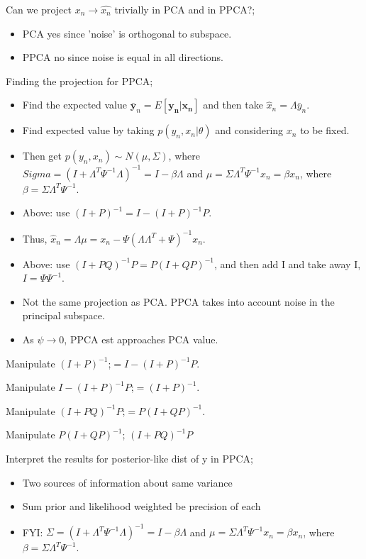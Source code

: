\documentclass{article}
\begin{document}
Can we project $x_n \rightarrow \hat{x_n}$ trivially in PCA and in PPCA?; \begin{itemize} \item PCA yes since 'noise' is orthogonal to subspace.  \item PPCA no since noise is equal in all directions.  \end{itemize} 

Finding the projection for PPCA; \begin{itemize} \item Find the expected value $\mathbf{\bar{y}}_n=E[\mathbf{y_n|x_n}]$ and then take $\hat{x}_n=\Lambda\bar{y}_n$.  \item Find expected value by taking $p(y_n, x_n|\theta)$ and considering $x_n$ to be fixed.  \item Then get $p(y_n, x_n) \sim N(\mu, \Sigma)$, where $Sigma = (I+\Lambda^T\Psi^{-1}\Lambda)^{-1}=I-\beta\Lambda$ and $\mu=\Sigma\Lambda^T\Psi^{-1}x_n=\beta x_n$, where $\beta = \Sigma\Lambda^T\Psi^{-1}$.  \item Above: use $(I+P)^{-1}=I-(I+P)^{-1}P$.  \item Thus, $\hat{x}_n=\Lambda\mu=x_n - \Psi(\Lambda\Lambda^T+\Psi)^{-1}x_n$.  \item Above: use $(I+PQ)^{-1}P=P(I+QP)^{-1}$, and then add I and take away I, $I=\Psi\Psi^{-1}$.  \item Not the same projection as PCA. PPCA takes into account noise in the principal subspace.  \item As $\psi\rightarrow 0$, PPCA est approaches PCA value.  \end{itemize}

Manipulate $(I+P)^{-1}$;$=I-(I+P)^{-1}P$.

Manipulate $I-(I+P)^{-1}P$;$=(I+P)^{-1}$.

Manipulate $(I+PQ)^{-1}P$;$=P(I+QP)^{-1}$.

Manipulate $P(I+QP)^{-1}$; $(I+PQ)^{-1}P$

Interpret the results for posterior-like dist of y in PPCA; \begin{itemize} \item Two sources of information about same variance \item Sum prior and likelihood weighted be precision of each \item FYI: $\Sigma = (I+\Lambda^T\Psi^{-1}\Lambda)^{-1}=I-\beta\Lambda$ and $\mu=\Sigma\Lambda^T\Psi^{-1}x_n=\beta x_n$, where $\beta = \Sigma\Lambda^T\Psi^{-1}$.	\end{itemize}
\end{document}
